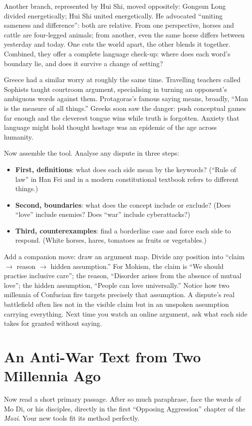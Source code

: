 Another branch, represented by Hui Shi, moved oppositely: Gongsun Long divided energetically; Hui Shi united energetically. He advocated ``uniting sameness and difference'': both are relative. From one perspective, horses and cattle are four-legged animals; from another, even the same horse differs between yesterday and today. One cuts the world apart, the other blends it together. Combined, they offer a complete language check-up: where does each word's boundary lie, and does it survive a change of setting?

Greece had a similar worry at roughly the same time. Travelling teachers called Sophists taught courtroom argument, specialising in turning an opponent's ambiguous words against them. Protagoras's famous saying means, broadly, ``Man is the measure of all things.'' Greeks soon saw the danger: push conceptual games far enough and the cleverest tongue wins while truth is forgotten. Anxiety that language might hold thought hostage was an epidemic of the age across humanity.

Now assemble the tool. Analyse any dispute in three steps:

\begin{itemize}
\item \textbf{First, definitions}: what does each side mean by the keywords? (``Rule of law'' in Han Fei and in a modern constitutional textbook refers to different things.)
\item \textbf{Second, boundaries}: what does the concept include or exclude? (Does ``love'' include enemies? Does ``war'' include cyberattacks?)
\item \textbf{Third, counterexamples}: find a borderline case and force each side to respond. (White horses, hares, tomatoes as fruits or vegetables.)
\end{itemize}
Add a companion move: draw an argument map. Divide any position into ``claim $\rightarrow$ reason $\rightarrow$ hidden assumption.'' For Mohism, the claim is ``We should practise inclusive care''; the reason, ``Disorder arises from the absence of mutual love''; the hidden assumption, ``People can love universally.'' Notice how two millennia of Confucian fire targets precisely that assumption. A dispute's real battlefield often lies not in the visible claim but in an unspoken assumption carrying everything. Next time you watch an online argument, ask what each side takes for granted without saying.

\section{An Anti-War Text from Two Millennia Ago}
Now read a short primary passage. After so much paraphrase, face the words of Mo Di, or his disciples, directly in the first ``Opposing Aggression'' chapter of the \textit{Mozi}. Your new tools fit its method perfectly.

